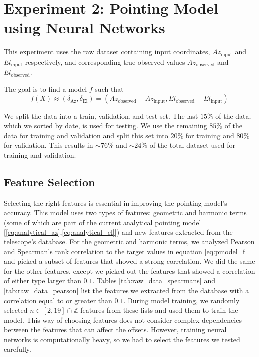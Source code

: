 \section{Experiment 2: Pointing Model using Neural Networks}
This experiment uses the raw dataset containing input coordinates, $Az_{\text{input}}$ and $El_{\text{input}}$ respectively, and corresponding true observed values $Az_{\text{observed}}$ and $El_{\text{observed}}$.

The goal is to find a model $f$ such that
\begin{equation}\label{eq:pmodel_f}
    f(X) \approx (\delta_{\text{Az}}, \delta_{\text{El}}) = (Az_{\text{observed}}-Az_{\text{input}}, El_{\text{observed}}-El_{\text{input}})
\end{equation}

We split the data into a train, validation, and test set.
The last $15\%$ of the data, which we sorted by date, is used for testing.
We use the remaining $85\%$ of the data for training and validation and split this set into $20\%$ for training and $80\%$ for validation.
This results in $\sim 76\%$ and $\sim 24\%$ of the total dataset used for training and validation.

\subsection{Feature Selection}
Selecting the right features is essential in improving the pointing model's accuracy.
This model uses two types of features: geometric and harmonic terms (some of which are part of the current analytical pointing model [\eqref{eq:analytical_az},\eqref{eq:analytical_el}]) and new features extracted from the telescope's database.
For the geometric and harmonic terms, we analyzed Pearson and Spearman's rank correlation to the target values in equation \eqref{eq:pmodel_f} and picked a subset of features that showed a strong correlation. 
We did the same for the other features, except we picked out the features that showed a correlation of either type larger than $0.1$.
Tables \ref{tab:raw_data_spearmans} and \ref{tab:raw_data_pearson} list the features we extracted from the database with a correlation equal to or greater than $0.1$.
During model training, we randomly selected $n \in [2, 19] \cap \mathbb{Z}$ features from these lists and used them to train the model.
This way of choosing features does not consider complex dependencies between the features that can affect the offsets.
However, training neural networks is computationally heavy, so we had to select the features we tested carefully.

